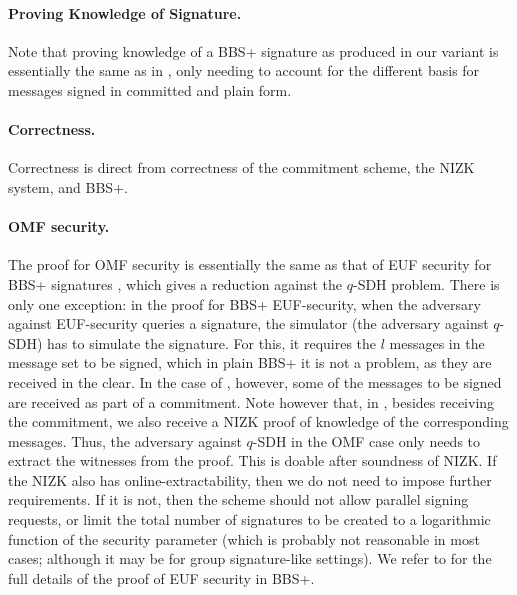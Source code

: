 \paragraph{Proving Knowledge of Signature.} %
Note that proving knowledge of a BBS+ signature as produced in our \SBCM variant
is essentially the same as in \cite{asm06,cdl16b}, only needing to account for
the different basis for messages signed in committed and plain form.

\paragraph{Correctness.} Correctness is direct from correctness of the
commitment scheme, the NIZK system, and BBS+.

\paragraph{OMF security.} The proof for OMF security is essentially the
same as that of EUF security for BBS+ signatures \cite{cdl16b}, which gives a
reduction against the $q$-SDH problem. There is only one exception: in the proof
for BBS+ EUF-security, when the adversary against EUF-security queries a
signature, the simulator (the adversary against $q$-SDH) has to simulate the
signature. For this, it requires the $l$ messages in the message set to be
signed, which in plain BBS+ it is not a problem, as they are received in the
clear. In the case of \SBCM, however, some of the messages to be signed are
received as part of a commitment. Note however that, in \SBCM, besides receiving
the commitment, we also receive a NIZK proof of knowledge of the corresponding
messages. Thus, the adversary against $q$-SDH in the OMF case only needs to
extract the witnesses from the proof. This is doable after soundness of NIZK.
If the NIZK also has online-extractability, then we do not need to impose
further requirements. If it is not, then the \SBCM scheme should not allow
parallel signing requests, or limit the total number of signatures to be
created to a logarithmic function of the security parameter (which is probably
not reasonable in most cases; although it may be for group signature-like
settings). We refer to \cite[Lemma 1]{cdl16b} for the full details of the proof
of EUF security in BBS+.
%

